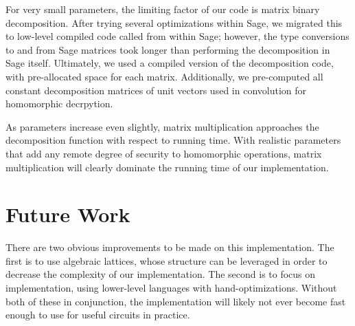 \documentclass{article}
\begin{document}
For very small parameters, the limiting factor of our code is matrix binary
decomposition. After trying several optimizations within Sage, we migrated
this to low-level compiled code called from within Sage; however, the type 
conversions to and from Sage matrices took longer than performing the 
decomposition in Sage itself. Ultimately, we used a compiled version of the 
decomposition code, with pre-allocated space for each matrix. Additionally,
we pre-computed all constant decomposition matrices of unit vectors used in
convolution for homomorphic decrpytion.

As parameters increase even slightly, matrix multiplication approaches the 
decomposition function with respect to running time. With realistic parameters
that add any remote degree of security to homomorphic operations, matrix 
multiplication will clearly dominate the running time of our implementation.

\section{Future Work}

There are two obvious improvements to be made on this implementation. The first
is to use algebraic lattices, whose structure can be leveraged in order to
decrease the complexity of our implementation. The second is to focus on
implementation, using lower-level languages with hand-optimizations. Without
both of these in conjunction, the implementation will likely not ever become
fast enough to use for useful circuits in practice. 
\end{document}

